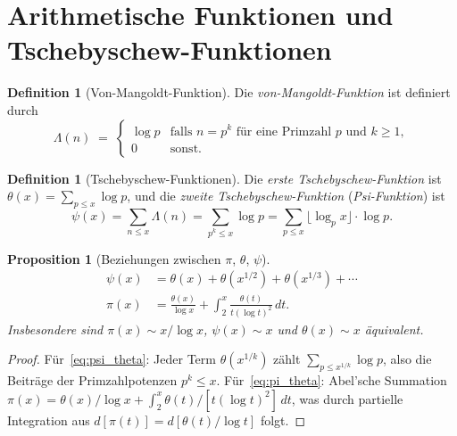 \documentclass[12pt,a4paper]{amsart}
\newtheorem{proposition}[theorem]{Proposition}
\theoremstyle{definition}
\newtheorem{definition}[theorem]{Definition}
\begin{document}
\section{Arithmetische Funktionen und Tschebyschew-Funktionen}

\begin{definition}[Von-Mangoldt-Funktion]
\label{def:mangoldt}
Die \emph{von-Mangoldt-Funktion} ist definiert durch
\[
  \Lambda(n) \;=\;
  \begin{cases}
    \log p & \text{falls } n = p^k \text{ f\"ur eine Primzahl } p
             \text{ und } k \ge 1, \\
    0      & \text{sonst.}
  \end{cases}
\]
\end{definition}

\begin{definition}[Tschebyschew-Funktionen]
\label{def:chebyshev}
Die \emph{erste Tschebyschew-Funktion} ist
$\theta(x) = \sum_{p \le x} \log p$,
und die \emph{zweite Tschebyschew-Funktion} (\emph{Psi-Funktion}) ist
\[
  \psi(x) = \sum_{n \le x} \Lambda(n) = \sum_{p^k \le x} \log p
           = \sum_{p \le x} \lfloor\log_p x\rfloor \cdot \log p.
\]
\end{definition}

\begin{proposition}[Beziehungen zwischen $\pi$, $\theta$, $\psi$]
\label{prop:psi_theta_pi}
\begin{align}
  \psi(x) &= \theta(x) + \theta(x^{1/2}) + \theta(x^{1/3}) + \cdots
  \label{eq:psi_theta} \\
  \pi(x) &= \frac{\theta(x)}{\log x}
    + \int_2^x \frac{\theta(t)}{t(\log t)^2}\,dt.
  \label{eq:pi_theta}
\end{align}
Insbesondere sind $\pi(x) \sim x/\log x$, $\psi(x) \sim x$ und
$\theta(x) \sim x$ \"aquivalent.
\end{proposition}

\begin{proof}
F\"ur~\eqref{eq:psi_theta}: Jeder Term $\theta(x^{1/k})$ z\"ahlt
$\sum_{p \le x^{1/k}} \log p$, also die Beitr\"age der Primzahlpotenzen
$p^k \le x$.
F\"ur~\eqref{eq:pi_theta}: Abel'sche Summation
$\pi(x) = \theta(x)/\log x + \int_2^x \theta(t)/[t(\log t)^2]\,dt$,
was durch partielle Integration aus $d[\pi(t)] = d[\theta(t)/\log t]$ folgt.
\end{proof}
\end{document}
